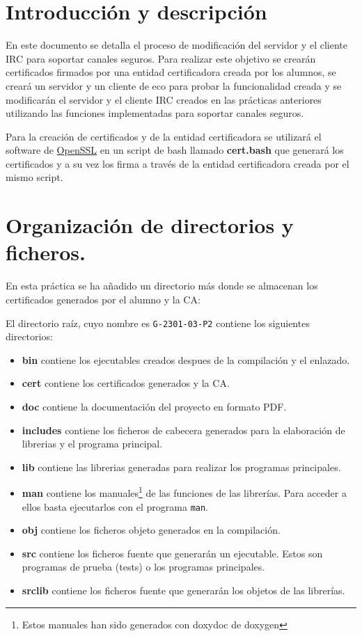 \documentclass{mathnotes}
\title{\thetitle}
\author{\theauthor}
\date{Curso 2013 - 2014\\Universidad Autónoma de Madrid}
\begin{document}
\section{Introducción y descripción}
En este documento se detalla el proceso de modificación del servidor y el cliente IRC para soportar canales seguros. Para realizar este objetivo se crearán certificados firmados por una entidad certificadora creada por los alumnos, se creará un servidor y un cliente de eco para probar la funcionalidad creada y se modificarán el servidor y el cliente IRC creados en las prácticas anteriores utilizando las funciones implementadas para soportar canales seguros.

Para la creación de certificados y de la entidad certificadora se utilizará el software de \href{https://www.openssl.org/}{OpenSSL} en un script de bash llamado \textbf{cert.bash} que generará los certificados y a su vez los firma a través de la entidad certificadora creada por el mismo script.

\section{Organización de directorios y ficheros.}
En esta práctica se ha añadido un directorio más donde se almacenan los certificados generados por el alumno y la CA:

El directorio raíz, cuyo nombre es \texttt{G-2301-03-P2} contiene los siguientes directorios:

\begin{itemize}
\item \textbf{bin} contiene los ejecutables creados despues de la compilación y el enlazado.

\item \textbf{cert} contiene los certificados generados y la CA.

\item \textbf{doc} contiene la documentación del proyecto en formato PDF.

\item \textbf{includes} contiene los ficheros de cabecera generados para la elaboración de librerias y el programa principal.

\item \textbf{lib} contiene las librerias generadas para realizar los programas principales.

\item \textbf{man} contiene los manuales\footnote{Estos manuales han sido generados con doxydoc de doxygen} de las funciones de las librerías. Para acceder a ellos basta ejecutarlos con el programa \texttt{man}.

\item \textbf{obj} contiene los ficheros objeto generados en la compilación.

\item \textbf{src} contiene los ficheros fuente que generarán un ejecutable. Estos son programas de prueba (tests) o los programas principales.

\item \textbf{srclib} contiene los ficheros fuente que generarán los objetos de las librerías.
\end{itemize}
\end{document}
